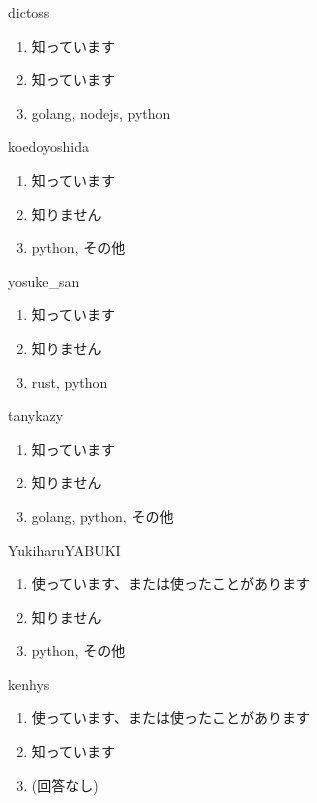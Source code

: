 \begin{prework}{ dictoss }
  \begin{enumerate}
  \item 知っています
  \item 知っています
  \item golang, nodejs, python
  \end{enumerate}
\end{prework}

\begin{prework}{ koedoyoshida }
  \begin{enumerate}
  \item 知っています
  \item 知りません
  \item python, その他
  \end{enumerate}
\end{prework}

\begin{prework}{ yosuke\_san }
  \begin{enumerate}
  \item 知っています
  \item 知りません
  \item rust, python
  \end{enumerate}
\end{prework}

\begin{prework}{ tanykazy }
  \begin{enumerate}
  \item 知っています
  \item 知りません
  \item golang, python, その他
  \end{enumerate}
\end{prework}

\begin{prework}{ YukiharuYABUKI }
  \begin{enumerate}
  \item 使っています、または使ったことがあります
  \item 知りません
  \item python, その他
  \end{enumerate}
\end{prework}

\begin{prework}{ kenhys }
  \begin{enumerate}
  \item 使っています、または使ったことがあります
  \item 知っています
  \item (回答なし)
  \end{enumerate}
\end{prework}

